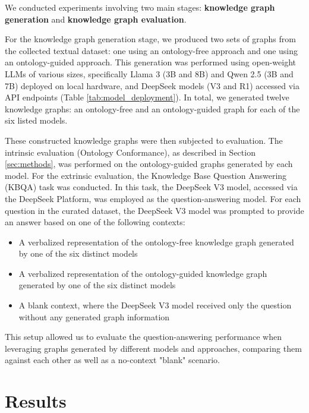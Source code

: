 \documentclass[a4, conference]{IEEEtran}
\begin{document}
We conducted experiments involving two main stages: \textbf{knowledge graph generation} and \textbf{knowledge graph evaluation}.

For the knowledge graph generation stage, we produced two sets of graphs from the collected textual dataset: one using an ontology-free approach and one using an ontology-guided approach. This generation was performed using open-weight LLMs of various sizes, specifically Llama 3 \cite{grattafiori2024llama3herdmodels} (3B and 8B) and Qwen 2.5 \cite{qwen2025qwen25technicalreport} (3B and 7B) deployed on local hardware, and DeepSeek \cite{deepseekai2024deepseekv3technicalreport,deepseekai2025deepseekr1incentivizingreasoningcapability} models (V3 and R1) accessed via API endpoints (Table \ref{tab:model_deployment}). In total, we generated twelve knowledge graphs: an ontology-free and an ontology-guided graph for each of the six listed models.

These constructed knowledge graphs were then subjected to evaluation. The intrinsic evaluation (Ontology Conformance), as described in Section \ref{sec:methods}, was performed on the ontology-guided graphs generated by each model. For the extrinsic evaluation, the Knowledge Base Question Answering (KBQA) task was conducted. In this task, the DeepSeek V3 model, accessed via the DeepSeek Platform, was employed as the question-answering model. For each question in the curated dataset, the DeepSeek V3 model was prompted to provide an answer based on one of the following contexts:
\begin{itemize}
    \item A verbalized representation of the ontology-free knowledge graph generated by one of the six distinct models
    \item A verbalized representation of the ontology-guided knowledge graph generated by one of the six distinct models
    \item A blank context, where the DeepSeek V3 model received only the question without any generated graph information
\end{itemize}

This setup allowed us to evaluate the question-answering performance when leveraging graphs generated by different models and approaches, comparing them against each other as well as a no-context "blank" scenario.

\section{Results}
\end{document}
